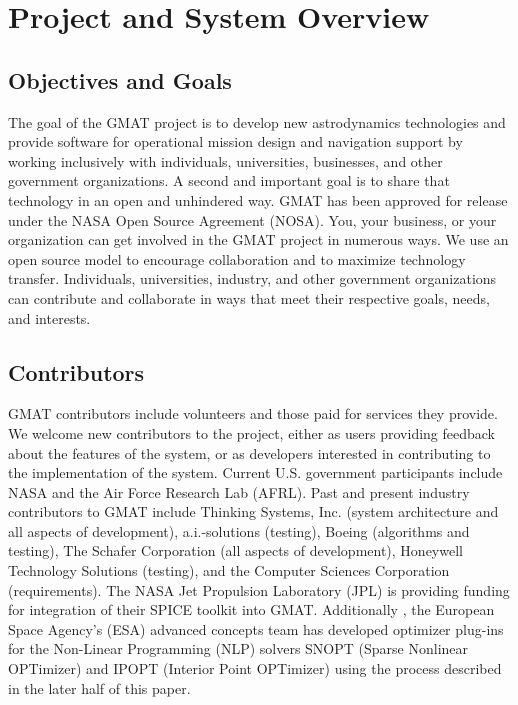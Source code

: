 \section{Project and System Overview}

\subsection{Objectives and Goals}

The goal of the GMAT project is to develop new astrodynamics technologies and
provide
software for operational mission design and navigation support
by working inclusively with individuals, universities, businesses, and other
government organizations.  A second and important goal is to share that
technology in an open and unhindered way. GMAT has been approved for release
under the NASA Open Source Agreement (NOSA). You, your business, or your
organization can get involved in the GMAT project in numerous ways. We use an
open source model to encourage collaboration and to maximize technology
transfer.  Individuals, universities, industry, and other government
organizations can contribute and collaborate in ways that meet their respective
goals, needs, and interests.

\subsection{Contributors}

GMAT contributors include volunteers and those paid for services they provide.
We welcome new contributors to the project, either as users providing feedback
about the features of the system, or as developers interested in contributing to
the implementation of the system.  Current U.S. government participants include
NASA and the Air Force Research Lab (AFRL).  Past and present industry contributors to GMAT
include Thinking Systems, Inc. (system architecture and all aspects of
development), a.i.-solutions (testing), Boeing (algorithms and testing), The
Schafer Corporation (all aspects of development), Honeywell Technology Solutions
(testing), and the Computer Sciences Corporation (requirements). The NASA Jet
Propulsion Laboratory (JPL) is providing funding for integration of their SPICE
toolkit into GMAT. Additionally , the European Space Agency's (ESA) advanced concepts team has
developed optimizer plug-ins for the Non-Linear Programming (NLP) solvers SNOPT (Sparse Nonlinear OPTimizer) and IPOPT (Interior Point OPTimizer) using the process described in
the later half of this paper.

